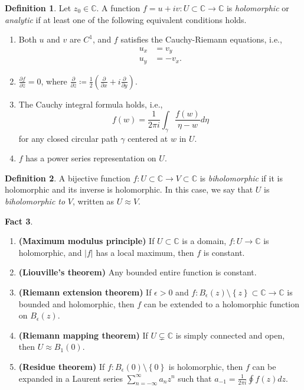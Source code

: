 \documentclass[10pt,letterpaper,cm]{nupset}
\theoremstyle{definition}
\newtheorem{defn}{Definition}[subsection]
\theoremstyle{theorem}
\newtheorem{fact}[defn]{Fact}
\theoremstyle{remark}
\newcommand{\C}{\mathbb C}
\newcommand{\1}{\mathbb{1}}
\newcommand{\0}{\vec 0}
\newcommand{\be}{\begin{enumerate}}
\newcommand{\ee}{\end{enumerate}}
\begin{document}
\begin{defn}
Let $z_0\in \C$. A function $f = u+iv : U\subset \C \to \C$ is \textit{holomorphic} or \textit{analytic} if at least one of  the following equivalent conditions holds.
\be[label=(\roman*)]
\item Both $u$ and $v$ are $C^1$, and $f$ satisfies the Cauchy-Riemann equations, i.e., 
\begin{align*}
u_x & = v_y
\\ u_y & = {-v_x}.
\end{align*}
\item $\frac{\partial{f}}{\partial{\bar{z}}} =0$, where $\frac{\partial}{\partial{\bar{z}}} \coloneqq \frac{1}{2}\left(\frac{\partial}{\partial{x}} + i\frac{\partial}{\partial{y}}\right ) .$
\item The Cauchy integral formula holds, i.e., 
\[f(w) = \frac{1}{2\pi i}\int_{\gamma}\frac{f(w)}{\eta -w}d{\eta}
\] for any closed circular path $\gamma$ centered at $w$ in $U$. 
\item $f$ has a power series representation on $U$.
\ee
\end{defn}

\smallskip

\begin{defn}
A bijective function $f: U \subset \C \to V \subset \C$ is \textit{biholomorphic} if it is holomorphic and its inverse is holomorphic. In this case, we say that $U$ is \textit{biholomorphic to} $V$, written as $U \approx V$.
\end{defn}

\begin{fact}\label{singfacts} $ $
\be[label = (\alph*)]
\item{\textbf{(Maximum modulus principle)}} If $U\subset \C$ is a domain, $f: U \to \C$ is holomorphic, and $\left\lvert{f}\right\rvert$ has a local maximum, then $f$ is constant. 
\item{\textbf{(Liouville's theorem)}} Any bounded entire function is constant. 
\item{\textbf{(Riemann extension theorem)}} If $\epsilon >0$ and $f: B_{\epsilon}(z) \setminus \left\{z\right\} \subset \C \to \C$ is bounded and holomorphic, then $f$ can be extended to a holomorphic function on $B_{\epsilon}(z)$.
\item{\textbf{(Riemann mapping theorem)}} If $U\subsetneq \C$ is simply connected and open, then $U\approx B_1(0)$. 
\item{\textbf{(Residue theorem)}} If $f: B_{\epsilon}(0)\setminus \left\{0\right\}$ is holomorphic, then $f$ can be expanded in a Laurent series
$\sum_{n={-\infty}}^{\infty}a_nz^n$ such that $a_{-1} = \frac{1}{2\pi i}\oint f(z)d{z}$.
\ee
\end{fact}
\end{document}
